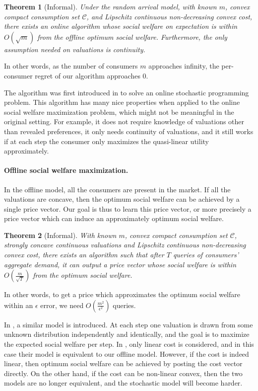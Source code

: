 \documentclass{article}
\newtheorem{theorem}{Theorem}[section]
\begin{document}
\begin{theorem}[Informal]
    Under the random arrival model, with known $m$, convex compact consumption set $\mathcal{C}$, and Lipschitz continuous non-decreasing convex cost, there exists an online algorithm whose social welfare on expectation is within $O(\sqrt{m})$ from the offline optimum social welfare. Furthermore, the only assumption needed on valuations is continuity.
\end{theorem}
In other words, as the number of consumers $m$ approaches infinity, the per-consumer regret of our algorithm approaches $0$.

The algorithm was first introduced in \cite{AD15} to solve an online stochastic programming problem. This algorithm has many nice properties when applied to the online social welfare maximization problem, which might not be meaningful in the original setting. For example, it does not require knowledge of valuations other than revealed preferences, it only needs continuity of valuations, and it still works if at each step the consumer only maximizes the quasi-linear utility approximately.

\paragraph{Offline social welfare maximization.}
In the offline model, all the consumers are present in the market. If all the valuations are concave, then the optimum social welfare can be achieved by a single price vector. Our goal is thus to learn this price vector, or more precisely a price vector which can induce an approximately optimum social welfare.

\begin{theorem}[Informal]
    With known $m$, convex compact consumption set $\mathcal{C}$, strongly concave continuous valuations and Lipschitz continuous non-decreasing convex cost, there exists an algorithm such that after $T$ queries of consumers' aggregate demand, it can output a price vector whose social welfare is within $O(\frac{m}{\sqrt{T}})$ from the optimum social welfare.
\end{theorem}
In other words, to get a price which approximates the optimum social welfare within an $\epsilon$ error, we need $O(\frac{m^2}{\epsilon^2})$ queries.

In \cite{RSUW17}, a similar model is introduced. At each step one valuation is drawn from some unknown distribution independently and identically, and the goal is to maximize the expected social welfare per step. In \cite{RSUW17}, only linear cost is considered, and in this case their model is equivalent to our offline model. However, if the cost is indeed linear, then optimum social welfare can be achieved by posting the cost vector directly. On the other hand, if the cost can be non-linear convex, then the two models are no longer equivalent, and the stochastic model will become harder.
\end{document}
